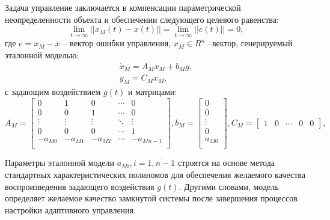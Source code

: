 \documentclass[14pt, a4paper]{extarticle}
\begin{document}
	Задача управление заключается в компенсации параметрической неопределенности объекта и обеспечении следующего целевого равенства:
	$$\lim\limits_{t\to\infty}\left|\left|x_M(t)-x(t)\right|\right|=\lim\limits_{t\to\infty}\left|\left|e(t)\right|\right|=0,$$
	где $e=x_M-x$ -- вектор ошибки управления, $x_M\in R^n$ --вектор, генерируемый эталонной моделью:
	$$\begin{matrix}
		\dot{x}_M = A_Mx_M + b_Mg,\\
		y_M = C_Mx_M,
	\end{matrix}$$
	с задающим воздействием $g(t)$ и матрицами:
	$$A_M=\left[\begin{matrix}
		0 & 1 & 0 & \cdots & 0 \\
		0 & 0 & 1 & \cdots & 0 \\
		\vdots & \vdots & \vdots & \ddots & \vdots \\
		0 & 0 & 0 & \cdots & 1 \\
		-a_{M0} & -a_{M1} & -a_{M2} & \cdots & -a_{Mn-1} \\
	\end{matrix}\right], b_M = \left[\begin{matrix}
		0 \\ 0 \\ \vdots \\ 0 \\ a_{M0} \\
	\end{matrix}\right], C_M = \left[\begin{matrix}
		1 & 0 & \cdots & 0 & 0
	\end{matrix}\right],$$

	Параметры эталонной модели $a_{Mi},i=\overline{1,n-1}$ строятся на основе метода стандартных характеристических полиномов для обеспечения желаемого качества воспроизведения задающего воздействия $g(t)$. Другими словами, модель определяет желаемое качество замкнутой системы после завершения процессов настройки адаптивного управления.
\end{document}
